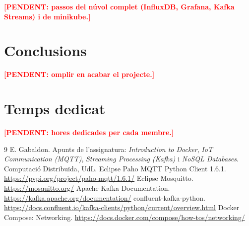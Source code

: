 \documentclass[11pt,a4paper]{article}
\newcommand{\pendent}[1]{\textcolor{red}{\textbf{[PENDENT: #1]}}}
\begin{document}
\pendent{passos del núvol complet (InfluxDB, Grafana, Kafka Streams) i de
minikube.}

\section{Conclusions}
\pendent{omplir en acabar el projecte.}

\section{Temps dedicat}
\pendent{hores dedicades per cada membre.}

\begin{thebibliography}{9}
 E. Gabaldon. Apunts de l'assignatura: \emph{Introduction to
  Docker}, \emph{IoT Communication (MQTT)}, \emph{Streaming Processing
  (Kafka)} i \emph{NoSQL Databases}. Computació Distribuïda, UdL.
 Eclipse Paho MQTT Python Client 1.6.1.
  \url{https://pypi.org/project/paho-mqtt/1.6.1/}
 Eclipse Mosquitto.
  \url{https://mosquitto.org/}
 Apache Kafka Documentation.
  \url{https://kafka.apache.org/documentation/}
 confluent-kafka-python.
  \url{https://docs.confluent.io/kafka-clients/python/current/overview.html}
 Docker Compose: Networking.
  \url{https://docs.docker.com/compose/how-tos/networking/}
\end{thebibliography}
\end{document}
